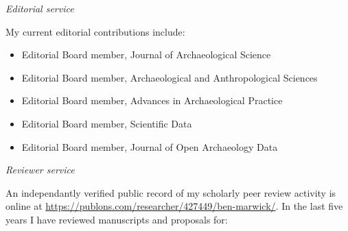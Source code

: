 \medskip

\noindent\emph{Editorial service\vspace{0.01in}}

\medskip

My current editorial contributions include:

\begin{itemize}[noitemsep, font=$\bullet$\scshape\bfseries]
\item Editorial Board member, Journal of Archaeological Science
\item Editorial Board member, Archaeological and Anthropological Sciences
\item Editorial Board member, Advances in Archaeological Practice
\item Editorial Board member, Scientific Data
\item Editorial Board member, Journal of Open Archaeology Data
\end{itemize}

\medskip

\noindent\emph{Reviewer service\vspace{0.01in}}

\medskip

An independantly verified public record of my scholarly peer review activity is online at \href{https://publons.com/researcher/427449/ben-marwick}{https://publons.com/researcher/427449/ben-marwick/}. In the last five years I have reviewed manuscripts and proposals for:

